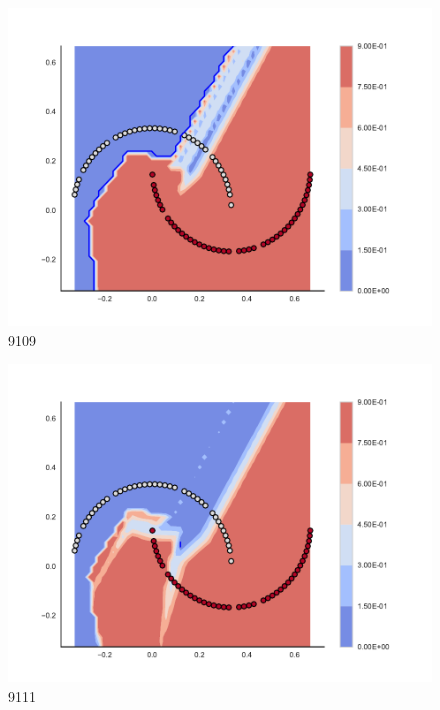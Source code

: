 \begin{subfigure}[b]{0.09\textwidth}
    \includegraphics[clip, trim=2.35cm 1.75cm 4.5cm 0cm,width=\textwidth]{img/convergence/9109.pdf}
    \caption{9109}
    \label{fig:convergence_9109}
\end{subfigure}
%
\begin{subfigure}[b]{0.09\textwidth}
    \includegraphics[clip, trim=2.35cm 1.75cm 4.5cm 0cm,width=\textwidth]{img/convergence/9111.pdf}
    \caption{9111}
    \label{fig:convergence_9111}
\end{subfigure}
%
